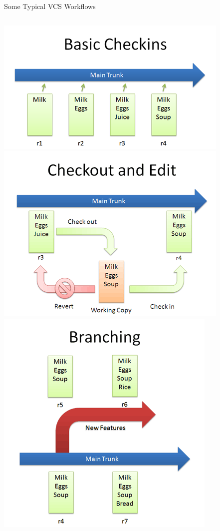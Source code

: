 \documentclass[10pt,xcolor=dvipsnames]{beamer}
\begin{document}
\begin{frame}{Some Typical VCS Workflows}
\begin{columns}
{\includegraphics [scale=0.3]{basic_checkin.png}}
\pause
{\includegraphics [scale=0.3]{checkout_edit.png}}
\pause
{}
{\includegraphics [scale=0.28]{first_branch.png}}

\end{columns}
\end{frame}
\end{document}
